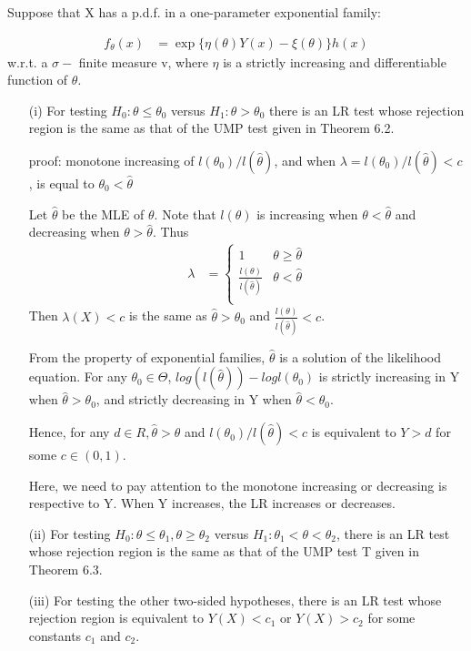 Suppose that X has a p.d.f. in a one-parameter exponential family: 
 
\begin{align*}
	f_{\theta}(x) &= \exp \{ \eta (\theta) Y(x) - \xi(\theta)  \} h(x) 
\end{align*}
w.r.t. a $\sigma-$ finite measure v, where $\eta$ is a strictly increasing and differentiable function of $\theta$.

\begin{itemize}
	\item [(i)]  For testing $H_0: \theta \leq \theta_0 $ versus $H_1: \theta > \theta_0 $  there is an LR test whose rejection region is the same as that of the UMP test given in
Theorem 6.2.
	
	proof: monotone increasing of $l(\theta_0)/l(\hat{\theta})$, and when $\lambda = l(\theta_0)/l(\hat{\theta}) < c$, is equal to $\theta_0 < \hat{\theta}$
	
	Let $\hat{\theta}$ be the MLE of $\theta$. 
	Note that $l{(\theta)}$ is increasing when $\theta < \hat{\theta}$ and decreasing when $\theta > \hat{\theta}$. Thus
\begin{align*}
	\lambda &= \begin{cases}
	 1 & \theta \geq \hat{\theta} \\
	 \frac{l(\theta)}{l(\hat{\theta})} & \theta < \hat{\theta} \\
	\end{cases}
\end{align*}
Then $\lambda(X) < c$ is the same as $ \hat{\theta} > \theta_0$ and $\frac{l(\theta)}{l(\hat{\theta})} < c$.

From the property of exponential families, $ \hat{\theta} $ is a solution of the likelihood equation. For any $\theta_0 \in \Theta$, $log(l(\hat{\theta})) - log l(\theta_0)$ is strictly increasing in Y when $\hat{\theta} > \theta_0$, and strictly decreasing in Y when $\hat{\theta} < \theta_0$. 

Hence, for any $d \in R, \hat{\theta} > \theta$  and $l(\theta_0)/l(\hat{\theta}) < c$ is equivalent to $Y > d$ for some $c \in (0,1)$.

Here, we need to pay attention to the monotone increasing or decreasing is respective to Y. When Y increases, the LR increases or decreases.


	\item[(ii)]  For testing $H_0: \theta \leq \theta_1,  \theta \geq \theta_2$ versus $H_1: \theta_1 < \theta < \theta_2 $, there is an LR test whose rejection region is the same as that of the UMP test T given in Theorem 6.3.
	
	\item[(iii)] For testing the other two-sided hypotheses, there is an LR test whose rejection region is equivalent to $Y(X) < c_1$ or $Y(X) > c_2 $ for some constants $c_1$ and $c_2$.
	

\end{itemize}

